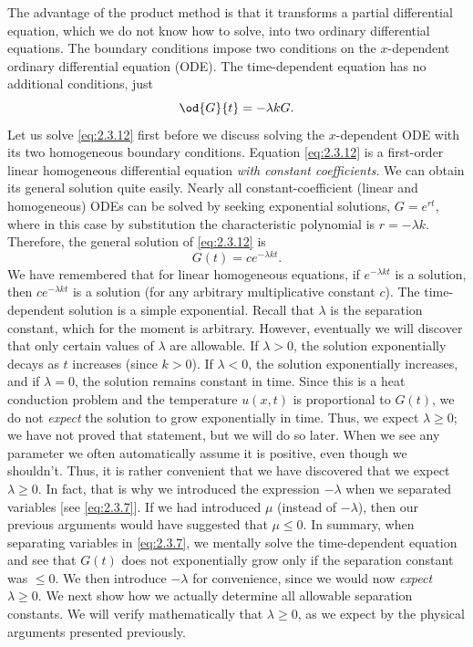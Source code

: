 The advantage of the product method is that it transforms a partial differential equation, which we do not know how to solve, into two ordinary differential equations. The boundary conditions impose two conditions on the $x$-dependent ordinary differential equation (ODE). The time-dependent equation has no additional conditions, just
\begin{equation}
\label{eq:2.3.12}
\od{G}{t} = -\lambda k G.
\end{equation}
Let us solve \eqref{eq:2.3.12} first before we discuss solving the $x$-dependent ODE with its two homogeneous boundary conditions. Equation \eqref{eq:2.3.12} is a first-order linear homogeneous differential equation \emph{with constant coefficients}. We can obtain its general solution quite easily. Nearly all constant-coefficient (linear and homogeneous) ODEs can be solved by seeking exponential solutions, $G = e^{rt}$, where in this case by substitution the characteristic polynomial is $r = -\lambda k$. Therefore, the general solution of \eqref{eq:2.3.12} is
\begin{equation}
\label{eq:2.3.13}
G(t) = ce^{-\lambda kt}.
\end{equation}
We have remembered that for linear homogeneous equations, if $e^{-\lambda kt}$ is a solution, then $ce^{-\lambda kt}$ is a solution (for any arbitrary multiplicative constant $c$). The time-dependent solution is a simple exponential. Recall that $\lambda$ is the separation constant, which for the moment is arbitrary. However, eventually we will discover that only certain values of $\lambda$ are allowable. If $\lambda > 0$, the solution exponentially decays as $t$ increases (since $k > 0$). If $\lambda < 0$, the solution exponentially increases, and if $\lambda = 0$, the solution remains constant in time. Since this is a heat conduction problem and the temperature $u(x,t)$ is proportional to $G(t)$, we do not \emph{expect} the solution to grow exponentially in time. Thus, we expect $\lambda \ge 0$; we have not proved that statement, but we will do so later. When we see any parameter we often automatically assume it is positive, even though we shouldn't. Thus, it is rather convenient that we have discovered that we expect $\lambda \ge 0$. In fact, that is why we introduced the expression $-\lambda$ when we separated variables [see \eqref{eq:2.3.7}]. If we had introduced $\mu$ (instead of $-\lambda$), then our previous arguments would have suggested that $\mu \le 0$. In summary, when separating variables in \eqref{eq:2.3.7}, we mentally solve the time-dependent equation and see that $G(t)$ does not exponentially grow only if the separation constant was $\le 0$. We then introduce $-\lambda$ for convenience, since we would now \emph{expect} $\lambda \ge 0$. We next show how we actually determine all allowable separation constants. We will verify mathematically that $\lambda \ge 0$, as we expect by the physical arguments presented previously.

